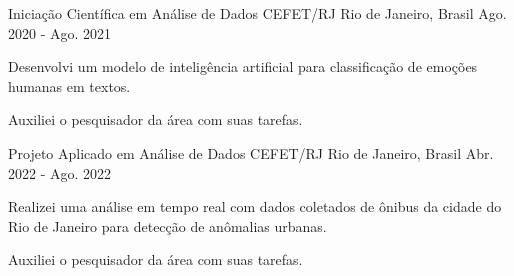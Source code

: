 

\begin{cventries}

  \cventry
    {Iniciação Científica em Análise de Dados} %
    {CEFET/RJ} %
    {Rio de Janeiro, Brasil} %
    {Ago. 2020 - Ago. 2021} %
    {
      \begin{cvitems} %
        \item {Desenvolvi um modelo de inteligência artificial para classificação de emoções humanas em textos.}
        \item {Auxiliei o pesquisador da área com suas tarefas.}
      \end{cvitems}
    }

  \cventry
    {Projeto Aplicado em Análise de Dados} %
    {CEFET/RJ} %
    {Rio de Janeiro, Brasil} %
    {Abr. 2022 - Ago. 2022} %
    {
      \begin{cvitems} %
        \item {Realizei uma análise em tempo real com dados coletados de ônibus da cidade do Rio de Janeiro para detecção de anômalias urbanas.}
        \item {Auxiliei o pesquisador da área com suas tarefas.}
      \end{cvitems}
    }

\end{cventries}
